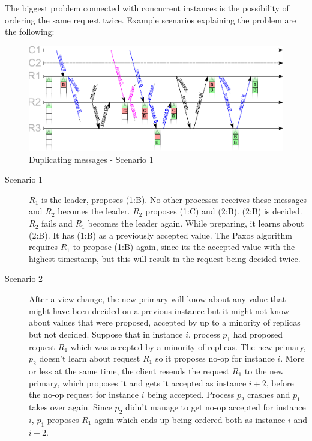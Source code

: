 The biggest problem connected with concurrent instances is the possibility of ordering the same request twice. Example scenarios explaining the problem are the following:
\begin{figure}[ht]
  \includegraphics[keepaspectratio, width=\textwidth]{paxos/duplicating_messages.pdf}
  \caption{Duplicating messages - Scenario 1}
\end{figure}
\begin{description}
  \item [Scenario 1] $R_1$ is the leader, proposes (1:B). No other processes receives these messages and $R_2$ becomes the leader. $R_2$ proposes (1:C) and (2:B). (2:B) is decided. $R_2$ fails and $R_1$ becomes the leader again. While preparing, it learns about (2:B). It has (1:B) as a previously accepted value. The Paxos algorithm requires $R_1$ to propose (1:B) again, since its the accepted value with the highest timestamp, but this will result in the request being decided twice.

  \item [Scenario 2] After a view change, the new primary will know about any value that might have been decided on a previous instance but it might not know about values that were proposed, accepted by up to a minority of replicas but not decided. Suppose that in instance $i$, process $p_1$ had proposed request $R_1$ which was accepted by a minority of replicas. The new primary, $p_2$ doesn't learn about request $R_1$
  so it proposes no-op for instance $i$. %
  More or less at the same time, the client resends the request $R_1$ to the new primary, which proposes it and gets it accepted as instance $i+2$, before the no-op request for instance $i$ being accepted. Process $p_2$ crashes and $p_1$ takes over again. Since $p_2$ didn't manage to get no-op accepted for instance $i$, $p_1$ proposes $R_1$ again which ends up being ordered both as instance $i$ and $i+2$.
\end{description} 

